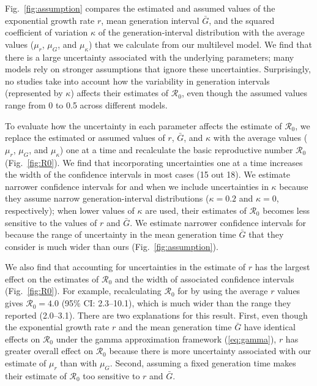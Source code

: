 \documentclass[12pt]{article}
\newcommand{\eref}[1]{(\ref{eq:#1})}
\newcommand{\fref}[1]{Fig.~\ref{fig:#1}}
\begin{document}
\fref{assumption} compares the estimated and assumed values of the exponential growth rate $r$, mean generation interval $\bar G$, and the squared coefficient of variation $\kappa$ of the generation-interval distribution with the average values ($\mu_r$, $\mu_G$, and $\mu_\kappa$) that we calculate from our multilevel model.
We find that there is a large uncertainty associated with the underlying parameters;
many models rely on stronger assumptions that ignore these uncertainties.
Surprisingly, no studies take into account how the variability in generation intervals (represented by $\kappa$) affects their estimates of $\mathcal R_0$, even though the assumed values range from 0 to 0.5 across different models.

To evaluate how the uncertainty in each parameter affects the estimate of $\mathcal R_0$,
we replace the estimated or assumed values of $r$, $\bar G$, and $\kappa$ with the average values ($\mu_r$, $\mu_G$, and $\mu_\kappa$) one at a time and recalculate the basic reproductive number $\mathcal R_0$ (\fref{R0}).
We find that incorporating uncertainties one at a time increases the width of the confidence intervals in most cases (15 out 18).
We estimate  narrower confidence intervals for \cite{liuncov} and \cite{majumderncov} when we include uncertainties in $\kappa$ because they assume narrow generation-interval distributions ($\kappa = 0.2$ and $\kappa=0$, respectively);
when lower values of $\kappa$ are used, their estimates of $\mathcal R_0$ becomes less sensitive to the values of $r$ and $\bar G$.
We estimate narrower confidence intervals for \citep{riouncov} because the range of uncertainty in the mean generation time $\bar G$ that they consider is much wider than ours (\fref{assumption}).

We also find that accounting for uncertainties in the estimate of $r$ has the largest effect on the estimates of $\mathcal R_0$ and the width of associated confidence intervals (\fref{R0}).
For example, recalculating $\mathcal R_0$ for \cite{majumderncov} by using the average $r$ values gives $\mathcal R_0 = 4.0$ (95\% CI: 2.3--10.1), which is much wider than the range they reported (2.0--3.1).
There are two explanations for this result.
First, even though the exponential growth rate $r$ and the mean generation time $\bar G$ have identical effects on $\mathcal R_0$ under the gamma approximation framework \eref{gamma},
$r$ has greater overall effect on $\mathcal R_0$ because there is more uncertainty associated with our estimate of $\mu_r$ than with $\mu_G$.
Second, assuming a fixed generation time makes their estimate of $\mathcal R_0$ too sensitive to $r$ and $\bar G$.
\end{document}
